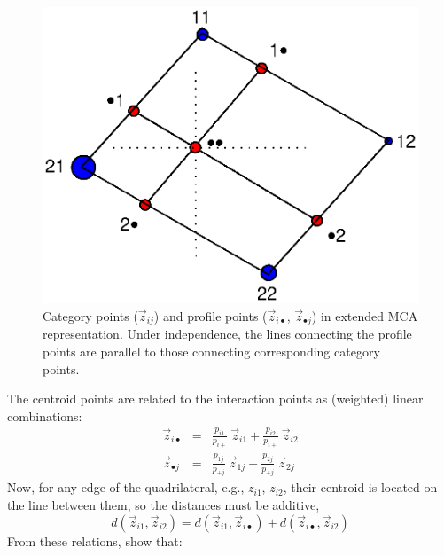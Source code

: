\begin{figure}[htb]
  \centering
  \includegraphics[scale=.9,clip]{ch5/fig/mcaidemo}
  \caption[Category points and profile points in extended MCA representation]{Category points ($\vec{z}_{ij}$) and profile points
  ($\vec{z}_{i\bullet}$, $\vec{z}_{\bullet j}$) in extended MCA representation. Under independence, the lines connecting the profile points are parallel to those connecting corresponding category points.}\label{fig:mcaidemo}
\end{figure}
The centroid points are related to the interaction points as (weighted)
linear combinations:
\begin{eqnarray*}%
  \vec{z}_{i \bullet} & = &
   \frac{p_{i1}}{p_{i+}} \: \vec{z}_{i1} +
   \frac{p_{i2}}{p_{i+}} \: \vec{z}_{i2} \\
  \vec{z}_{\bullet j} & = &
   \frac{p_{1j}}{p_{+j}} \: \vec{z}_{1j} +
   \frac{p_{2j}}{p_{+j}} \: \vec{z}_{2j}
\end{eqnarray*}
Now, for any edge of the quadrilateral, e.g., $z_{i1}$, $z_{i2}$,
their centroid is located on the line between them, so the
distances must be additive,
\begin{equation*}%
  d( \vec{z}_{i1}, \vec{z}_{i2} ) =
  d( \vec{z}_{i1}, \vec{z}_{i \bullet} ) +
  d( \vec{z}_{i \bullet}, \vec{z}_{i2} )
\end{equation*}
From these relations, \citet{MeulmanHeiser:97} show that:
